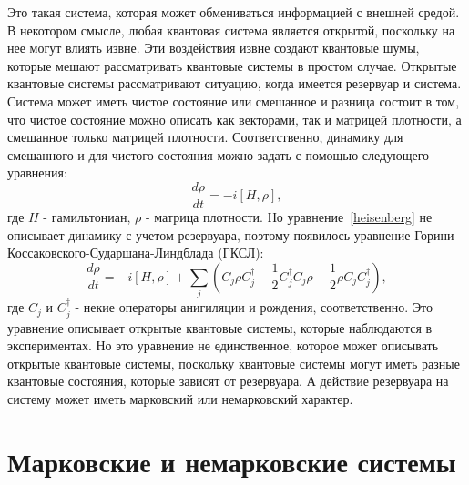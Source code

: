 Это такая система, которая может обмениваться информацией с внешней средой.
В некотором смысле, любая квантовая система является открытой, поскольку на нее могут влиять извне.
Эти воздействия извне создают квантовые шумы, которые мешают рассматривать квантовые системы в простом случае.
Открытые квантовые системы рассматривают ситуацию, когда имеется резервуар и система.
Система может иметь чистое состояние или смешанное и разница состоит в том, что чистое состояние можно
описать как векторами, так и матрицей плотности, а смешанное только матрицей плотности.
Соответственно, динамику для смешанного и для чистого состояния можно задать с помощью следующего уравнения:
\begin{equation}\label{heisenberg}
\frac{d \rho}{dt} = -i[H,\rho],
\end{equation}
где $H$ - гамильтониан, $\rho$ - матрица плотности.
Но уравнение~\eqref{heisenberg} не описывает динамику с учетом резервуара, поэтому появилось уравнение
Горини-Коссаковского-Сударшана-Линдблада (ГКСЛ):
\begin{equation}
    \frac{d \rho}{dt} = -i[H,\rho] +
    \sum_{j} (C_{j}\rho C^{\dagger}_{j} - \frac{1}{2} C^{\dagger}_{j} C_{j} \rho - \frac{1}{2} \rho C_{j} C^{\dagger}_{j}),
\end{equation}
где $C_{j}$ и $C^{\dagger}_{j}$ - некие операторы анигиляции и рождения, соответственно.
Это уравнение описывает открытые квантовые системы, которые наблюдаются в экспериментах.
Но это уравнение не единственное, которое может описывать открытые квантовые системы, поскольку
квантовые системы могут иметь разные квантовые состояния, которые зависят от резервуара.
А действие резервуара на систему может иметь марковский или немарковский характер.

\section{Марковские и немарковские системы}

